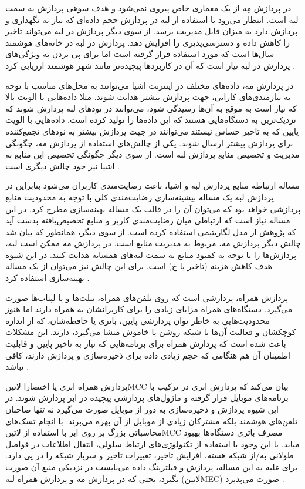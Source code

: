 در پردازش مِه از یک معماری خاص پیروی نمی‌شود و هدف سوهی پردازش به سمت لبه است. انتظار می‌رود با استفاده از لبه در پردازش حجم داده‌ای که نیاز به نگهداری و پردازش دارد به میزان قابل مدیریت برسد.
از سوی دیگر پردازش در لبه می‌تواند تاخیر را کاهش داده و دسترسی‌پذیری را افزایش دهد. پردازش در لبه در خانه‌های هوشمند سال‌ها است که مورد استفاده قرار گرفته است اما برای پی بردن به ویژگی‌های پردازش در لبه
نیاز است که آن در کاربردها پیچیده‌تر مانند شهر هوشمند ارزیابی کرد
.

در پردازش مه، داده‌های مختلف در اینترنت اشیا می‌توانند به محل‌های مناسب با توجه به نیازمندی‌های کارایی، جهت پردازش بیشتر هدایت شوند. مثلا داده‌هایی با الویت بالا که نیاز است به موقع به آن‌ها رسیدگی شود،
می‌توانند در نودهای لبه پردازش شوند که نزدیک‌ترین به دستگاه‌هایی هستند که این داده‌ها را تولید کرده است. داده‌هایی با الویت پایین که به تاخیر حساس نیستند می‌توانند در جهت پردازش بیشتر به نودهای تجمع‌کننده
برای پردازش بیشتر ارسال شوند.
یکی از چالش‌های استفاده از پردازش مه، چگونگی مدیریت و تخصیص منابع پردازش لبه است. از سوی دیگر چگونگی تخصیص این منابع به اشیا نیز خود چالش دیگری است
.

مساله ارتباطه منابع پردازش لبه و اشیا، باعث رضایت‌مندی کاربران می‌شود بنابراین در پردازش لبه یک مساله بیشینه‌سازی رضایت‌مندی کلی با توجه به محدودیت منابع پردازشی خواهد بود
که می‌توان آن را در قالب یک مساله بهینه‌سازی مطرح کرد. در این مساله نیاز است که ارتباطی میان رضایت‌مندی کاربر و منابع تخصیص‌یافته بدست آید که پژوهش  از مدل
لگاریتیمی استفاده کرده است.
از سوی دیگر، همانطور که بیان شد چالش دیگر پردازش مه، مربوط به مدیریت منابع است. در پردازش مه ممکن است لبه‌، پردازش‌ها را با توجه به کمبود منابع به سمت لبه‌های همسایه هدایت کنند.
در این شیوه هدف کاهش هزینه (تاخیر یا ‌خ) است. برای این چالش نیز می‌توان از یک مساله بهینه‌سازی استفاده کرد
.


پردازش همراه، پردازشی است که روی تلفن‌های همراه، تبلت‌ها و یا لپتاب‌ها صورت می‌گیرد. دستگاه‌های همراه مزایای زیادی را برای کاربرانشان به همراه دارند اما هنوز
محدودیت‌هایی به خاطر توان پردازشی پایین، باتری یا حافظه‌شان، که از اندازه کوچکشان و فعالیت آن‌ها با شبکه روشن یا خاموش منشا می‌گیرد، دارند.
این مشکلات باعث شده است که پردازش همراه برای برنامه‌هایی که نیاز به تاخیر پایین و قابلیت اطمینان آن هم هنگامی که حجم زیادی داده برای ذخیره‌سازی و پردازش دارند، کافی نباشد
.


پردازش همراه ابری یا اختصارا ‌لاتین{MCC} بیان می‌کند که پردازش ابری در ترکیب با برنامه‌های موبایل قرار گرفته و ماژول‌های پردازشی پیچیده در ابر پردازش شوند.
در این شیوه پردازش و ذخیره‌سازی به دور از موبایل صورت می‌گیرد نه تنها صاحبان تلفن‌های هوشمند بلکه مشترکان زیادی از موبایل از آن بهره می‌برند.
با انجام تسک‌های محاسباتی بزرگ بر روی ابر با استفاده از ‌لاتین{MCC} مصرف باتری دستگاه‌ها بهبود میابد.
با این وجود با استفاده از تکنولوژی‌های ارتباط سلولی، انتقال اطلاعات در فواصل طولانی به/از شبکه هسته، افزایش تاخیر، تغییرات تاخیر و سربار شبکه را در پی دارد.
برای غلبه به این مساله، پردازش و فیلترینگ داده می‌بایست در نزدیکی منبع آن صورت بگیرد، بحثی که در پردازش مه و پردازش همراه لبه (‌لاتین{MEC}) صورت می‌پذیرد
.

